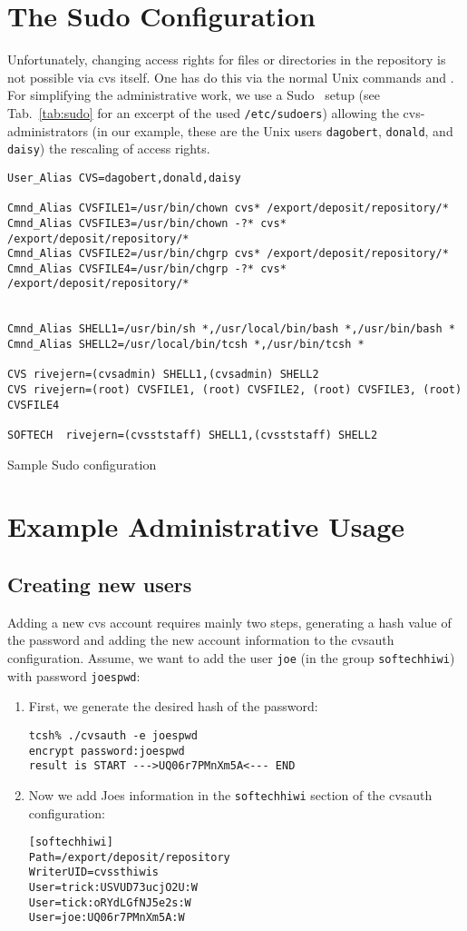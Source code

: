 \section{The Sudo Configuration}
Unfortunately, changing access rights for files or directories in the
repository is not possible via cvs itself. One has do this via the
normal Unix commands  and . For
simplifying the administrative work, we use a
Sudo~\cite{miller:sudo:2002} setup (see Tab.~\ref{tab:sudo} for an
excerpt of the used \verb|/etc/sudoers|) allowing the
cvs-administrators (in our example, these are the Unix users
\texttt{dagobert}, \texttt{donald}, and \texttt{daisy}) the rescaling
of access rights.
\begin{table}
{\small
\begin{verbatim}
User_Alias CVS=dagobert,donald,daisy

Cmnd_Alias CVSFILE1=/usr/bin/chown cvs* /export/deposit/repository/*
Cmnd_Alias CVSFILE3=/usr/bin/chown -?* cvs* /export/deposit/repository/*
Cmnd_Alias CVSFILE2=/usr/bin/chgrp cvs* /export/deposit/repository/*
Cmnd_Alias CVSFILE4=/usr/bin/chgrp -?* cvs* /export/deposit/repository/*


Cmnd_Alias SHELL1=/usr/bin/sh *,/usr/local/bin/bash *,/usr/bin/bash *
Cmnd_Alias SHELL2=/usr/local/bin/tcsh *,/usr/bin/tcsh *

CVS rivejern=(cvsadmin) SHELL1,(cvsadmin) SHELL2
CVS rivejern=(root) CVSFILE1, (root) CVSFILE2, (root) CVSFILE3, (root) CVSFILE4

SOFTECH  rivejern=(cvsststaff) SHELL1,(cvsststaff) SHELL2
\end{verbatim}
}
\caption{Sample Sudo configuration\label{tab:sudo}}
\end{table}

\section{Example Administrative Usage}
\subsection{Creating new users}
Adding a new cvs account requires mainly two steps, generating a hash
value of the password and adding the new account information to the
cvsauth configuration. Assume, we want to add the user \texttt{joe}
(in the group \texttt{softechhiwi}) with password \texttt{joespwd}:
\begin{enumerate}
\item First, we generate the desired hash of the password:
\begin{verbatim}
tcsh% ./cvsauth -e joespwd
encrypt password:joespwd
result is START --->UQ06r7PMnXm5A<--- END
\end{verbatim}
\item Now we add Joes information in the \texttt{softechhiwi} section of the
      cvsauth configuration:
\begin{verbatim}
[softechhiwi]
Path=/export/deposit/repository
WriterUID=cvssthiwis
User=trick:USVUD73ucjO2U:W
User=tick:oRYdLGfNJ5e2s:W
User=joe:UQ06r7PMnXm5A:W
\end{verbatim}
\end{enumerate}

